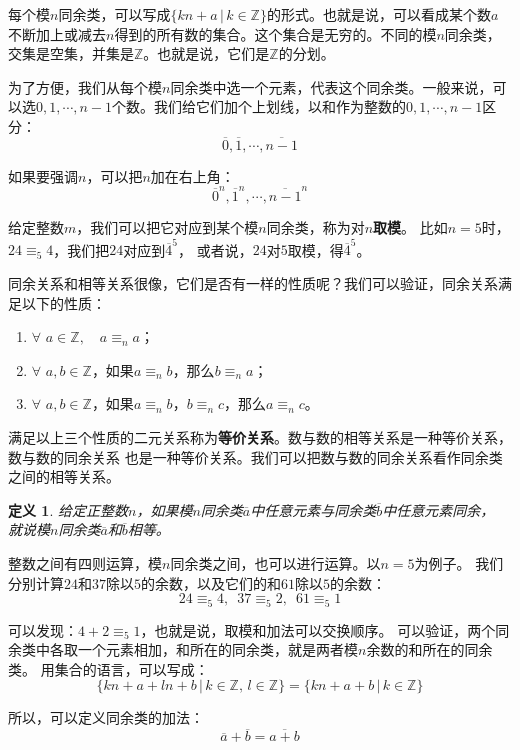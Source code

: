 \documentclass[12pt,UTF8]{ctexbook}
\newtheorem{df}{定义}[section]
\begin{document}
每个模$n$同余类，可以写成$\{kn + a \, | \, k\in\mathbb{Z} \}$的形式。也就是说，可以看成某个数$a$不断加上或减去$n$得到的所有数的集合。这个集合是无穷的。不同的模$n$同余类，交集是空集，并集是$\mathbb{Z}$。也就是说，它们是$\mathbb{Z}$的分划。

为了方便，我们从每个模$n$同余类中选一个元素，代表这个同余类。一般来说，可以选$0,1,\cdots,n-1$个数。我们给它们加个上划线，以和作为整数的$0,1,\cdots,n-1$区分：
$$\overline{0},\overline{1},\cdots,\overline{n-1}$$

如果要强调$n$，可以把$n$加在右上角：
$$\overline{0}^n,\overline{1}^n,\cdots,\overline{n-1}^n$$

给定整数$m$，我们可以把它对应到某个模$n$同余类，称为对$n$\textbf{取模}。
比如$n=5$时，$24 \equiv_5 4$，我们把$24$对应到$\overline{4}^5$，
或者说，$24$对$5$取模，得$\overline{4}^5$。

同余关系和相等关系很像，它们是否有一样的性质呢？我们可以验证，同余关系满足以下的性质：
\begin{enumerate}
    \item $\forall \,\, a\in \mathbb{Z}, \quad a \equiv_n a$；
    \item $\forall \,\, a, b \in \mathbb{Z}$，如果$a \equiv_n b$，那么$b \equiv_n a$；
    \item $\forall \,\, a, b \in \mathbb{Z}$，如果$a \equiv_n b$，$b \equiv_n c$，那么$a \equiv_n c$。
\end{enumerate}

满足以上三个性质的二元关系称为\textbf{等价关系}。数与数的相等关系是一种等价关系，数与数的同余关系
也是一种等价关系。我们可以把数与数的同余关系看作同余类之间的相等关系。

\begin{df}
    给定正整数$n$，如果模$n$同余类$\overline{a}$中任意元素与同余类$\overline{b}$中任意元素同余，
    就说模$n$同余类$\overline{a}$和$\overline{b}$相等。
\end{df}

整数之间有四则运算，模$n$同余类之间，也可以进行运算。以$n=5$为例子。
我们分别计算$24$和$37$除以$5$的余数，以及它们的和$61$除以$5$的余数：
$$ 24 \equiv_5 4, \,\,\, 37 \equiv_5 2 , \,\,\, 61 \equiv_5 1$$

可以发现：$ 4 + 2 \equiv_5 1$，也就是说，取模和加法可以交换顺序。
可以验证，两个同余类中各取一个元素相加，和所在的同余类，就是两者模$n$余数的和所在的同余类。
用集合的语言，可以写成：
$$\{kn + a + ln + b \, | \, k\in\mathbb{Z}, \, l\in\mathbb{Z} \} = \{kn + a + b \, | \, k\in\mathbb{Z} \}$$

所以，可以定义同余类的加法：
$$ \overline{a} + \overline{b} = \overline{a + b}$$
\end{document}
